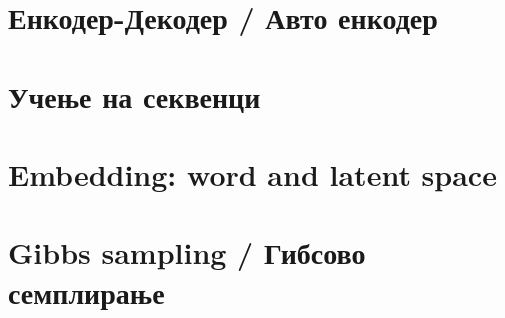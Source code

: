 \section{Енкодер-Декодер / Авто енкодер}

\section{Учење на секвенци}

\section{Embedding: word and latent space}

\section{Gibbs sampling / Гибсово семплирање}

